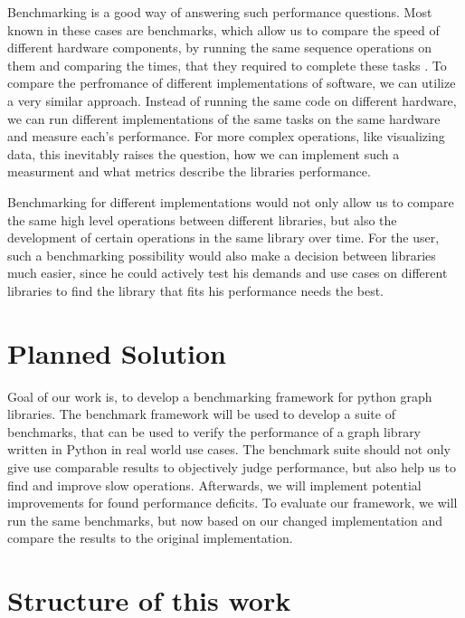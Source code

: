 Benchmarking is a good way of answering such performance questions. Most known in these cases are benchmarks, which allow us to compare the speed of different hardware components, by running the same sequence operations on them and comparing the times, that they required to complete these tasks \cite{OverviewBenchmarks}. To compare the perfromance of different implementations of software, we can utilize a very similar approach. Instead of running the same code on different hardware, we can run different implementations of the same tasks on the same hardware and measure each's performance. For more complex operations, like visualizing data, this inevitably raises the question, how we can implement such a measurment and what metrics describe the libraries performance.

Benchmarking for different implementations would not only allow us to compare the same high level operations between different libraries, but also the development of certain operations in the same library over time. For the user, such a benchmarking possibility would also make a decision between libraries much easier, since he could actively test his demands and use cases on different libraries to find the library that fits his performance needs the best.

\section{Planned Solution}
\label{sec:Introduction:problem}

Goal of our work is, to develop a benchmarking framework for python graph libraries.  The benchmark framework will be used to develop a suite of benchmarks, that can be used to verify the performance of a graph library written in Python in real world use cases. The benchmark suite should not only give use comparable results to objectively judge performance, but also help us to find and improve slow operations.
Afterwards, we will implement potential improvements for found performance deficits. To evaluate our framework, we will run the same benchmarks, but now based on our changed implementation and compare the results to the original implementation.
  
\section{Structure of this work}
\label{sec:Introduction:problem}

